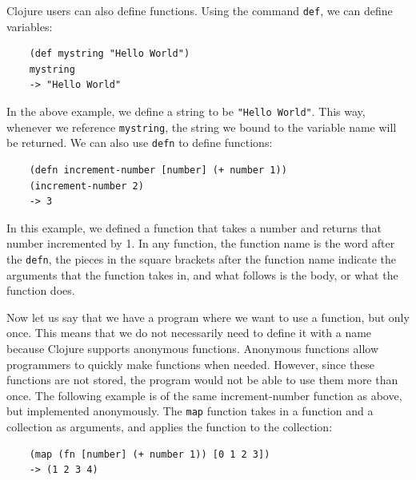 \documentclass[12pt]{article}
\newcommand{\comment}[1]{{\bf \tt  {#1}}}
\newcommand{\emcomment}[1]{\textcolor{ForestGreen}{\comment{Elena: {#1}}}}
\begin{document}

Clojure users can also define functions.
Using the command \texttt{def}, we can define variables:
\begin{verbatim}
	(def mystring "Hello World")
	mystring
	-> "Hello World"
\end{verbatim}

In the above example, we define a string to be \texttt{"Hello World"}. This way, whenever we reference 
\texttt{mystring}, the string we bound to the variable name will be returned. We can also use
\texttt{defn} to define functions:
\begin{verbatim}
	(defn increment-number [number] (+ number 1))
	(increment-number 2)
	-> 3
\end{verbatim}

In this example, we defined
a function that takes a number and returns that number incremented by 1.
In any function, the function name is the word after the \texttt{defn}, the pieces in the square
brackets after the function name indicate 
the arguments that the function takes in, and what follows is the body, or what the function does.

Now let us say that we have a program where we want to use a function, but only once. This means that
we do not necessarily need to define it with a name because Clojure supports anonymous functions.
Anonymous functions allow programmers to quickly make
functions when needed. 
However, since these functions are not  stored, the program would not be able to use them more than
once. 
The following example is of the same increment-number function as above, but implemented anonymously.
The \texttt{map} function takes in a function and a collection as arguments, and applies the function
to the collection: 
\begin{verbatim}
	(map (fn [number] (+ number 1)) [0 1 2 3])
	-> (1 2 3 4)
\end{verbatim}
\end{document}
